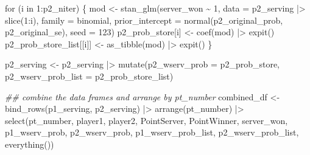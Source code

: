 \documentclass[
  letterpaper,
  DIV=11,
  numbers=noendperiod]{scrartcl}
\newenvironment{Shaded}{\begin{snugshade}}{\end{snugshade}}
\newcommand{\AttributeTok}[1]{\textcolor[rgb]{0.40,0.45,0.13}{#1}}
\newcommand{\ControlFlowTok}[1]{\textcolor[rgb]{0.00,0.23,0.31}{#1}}
\newcommand{\DecValTok}[1]{\textcolor[rgb]{0.68,0.00,0.00}{#1}}
\newcommand{\DocumentationTok}[1]{\textcolor[rgb]{0.37,0.37,0.37}{\textit{#1}}}
\newcommand{\FunctionTok}[1]{\textcolor[rgb]{0.28,0.35,0.67}{#1}}
\newcommand{\NormalTok}[1]{\textcolor[rgb]{0.00,0.23,0.31}{#1}}
\newcommand{\OtherTok}[1]{\textcolor[rgb]{0.00,0.23,0.31}{#1}}
\newcommand{\SpecialCharTok}[1]{\textcolor[rgb]{0.37,0.37,0.37}{#1}}
\begin{document}
\begin{Shaded}
\begin{Highlighting}[]
  \ControlFlowTok{for}\NormalTok{ (i }\ControlFlowTok{in} \DecValTok{1}\SpecialCharTok{:}\NormalTok{p2\_niter) \{}
\NormalTok{    mod }\OtherTok{\textless{}{-}} \FunctionTok{stan\_glm}\NormalTok{(server\_won }\SpecialCharTok{\textasciitilde{}} \DecValTok{1}\NormalTok{, }\AttributeTok{data =}\NormalTok{ p2\_serving }\SpecialCharTok{|\textgreater{}} \FunctionTok{slice}\NormalTok{(}\DecValTok{1}\SpecialCharTok{:}\NormalTok{i),}
                    \AttributeTok{family =}\NormalTok{ binomial,}
                    \AttributeTok{prior\_intercept =} \FunctionTok{normal}\NormalTok{(p2\_original\_prob, p2\_original\_se),}
                    \AttributeTok{seed =} \DecValTok{123}\NormalTok{)}
\NormalTok{    p2\_prob\_store[i] }\OtherTok{\textless{}{-}} \FunctionTok{coef}\NormalTok{(mod) }\SpecialCharTok{|\textgreater{}} \FunctionTok{expit}\NormalTok{()}
\NormalTok{    p2\_prob\_store\_list[[i]] }\OtherTok{\textless{}{-}} \FunctionTok{as\_tibble}\NormalTok{(mod) }\SpecialCharTok{|\textgreater{}} \FunctionTok{expit}\NormalTok{()}
\NormalTok{  \}}
  
\NormalTok{  p2\_serving }\OtherTok{\textless{}{-}}\NormalTok{ p2\_serving }\SpecialCharTok{|\textgreater{}}
    \FunctionTok{mutate}\NormalTok{(}\AttributeTok{p2\_wserv\_prob =}\NormalTok{ p2\_prob\_store,}
           \AttributeTok{p2\_wserv\_prob\_list =}\NormalTok{ p2\_prob\_store\_list)}
  
  \DocumentationTok{\#\# combine the data frames and arrange by pt\_number}
\NormalTok{  combined\_df }\OtherTok{\textless{}{-}} \FunctionTok{bind\_rows}\NormalTok{(p1\_serving, p2\_serving) }\SpecialCharTok{|\textgreater{}}
    \FunctionTok{arrange}\NormalTok{(pt\_number) }\SpecialCharTok{|\textgreater{}}
    \FunctionTok{select}\NormalTok{(pt\_number, player1, player2, PointServer, PointWinner, server\_won,}
\NormalTok{           p1\_wserv\_prob, p2\_wserv\_prob,}
\NormalTok{           p1\_wserv\_prob\_list, p2\_wserv\_prob\_list,}
           \FunctionTok{everything}\NormalTok{())}
  

\end{Highlighting}
\end{Shaded}
\end{document}
